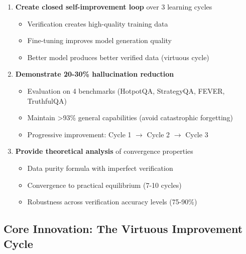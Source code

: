 \documentclass[12pt,a4paper]{article}
\theoremstyle{definition}
\begin{document}
\begin{enumerate}
    \item \textbf{Create closed self-improvement loop} over 3 learning cycles
    \begin{itemize}
        \item Verification creates high-quality training data
        \item Fine-tuning improves model generation quality
        \item Better model produces better verified data (virtuous cycle)
    \end{itemize}
    
    \item \textbf{Demonstrate 20-30\% hallucination reduction}
    \begin{itemize}
        \item Evaluation on 4 benchmarks (HotpotQA, StrategyQA, FEVER, TruthfulQA)
        \item Maintain >93\% general capabilities (avoid catastrophic forgetting)
        \item Progressive improvement: Cycle 1 $\rightarrow$ Cycle 2 $\rightarrow$ Cycle 3
    \end{itemize}
    
    \item \textbf{Provide theoretical analysis} of convergence properties
    \begin{itemize}
        \item Data purity formula with imperfect verification
        \item Convergence to practical equilibrium (7-10 cycles)
        \item Robustness across verification accuracy levels (75-90\%)
    \end{itemize}
\end{enumerate}

\subsection{Core Innovation: The Virtuous Improvement Cycle}
\end{document}
